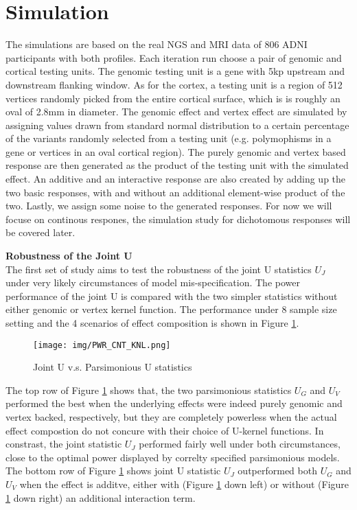\section{Simulation}
The simulations are based on the real NGS and MRI data of 806 ADNI participants with both profiles. Each iteration run choose a pair of genomic and cortical testing units. The genomic testing unit is a gene with 5kp upstream and downstream flanking window. As for the cortex, a testing unit is a region of 512 vertices randomly picked from the entire cortical surface, which is is roughly an oval of 2.8mm in diameter. The genomic effect and vertex effect are simulated by assigning values drawn from standard normal distribution to a certain percentage of the variants randomly selected from a testing unit (e.g. polymophisms in a gene or vertices in an oval cortical region). The purely genomic and vertex based response are then generated as the product of the testing unit with the simulated effect. An additive and an interactive response are also created by adding up the two basic responses, with and without an additional element-wise product of the two. Lastly, we assign some noise to the generated responses. For now we will focuse on continous respones, the simulation study for dichotomous responses will be covered later.

\noindent\textbf{Robustness of the Joint U} \\
The first set of study aims to test the robustness of the joint U statistics $U_J$ under very likely circumstances of model mis-specification. The power performance of the joint U is compared with the two simpler statistics without either genomic or vertex kernel function. The performance under 8 sample size setting and the 4 scenarios of effect composition is shown in Figure \ref{fig:PWR_CNT_KNL}.
\begin{figure}[!htbp]
\label{fig:PWR_CNT_KNL}
\centering
\texttt{[image: img/PWR\_CNT\_KNL.png]}
\caption{Joint U v.s. Parsimonious U statistics}
\end{figure}
The top row of Figure \ref{fig:PWR_CNT_KNL} shows that, the two parsimonious statistics $U_G$ and $U_V$ performed the best when the underlying effects were indeed purely genomic and vertex backed, respectively, but they are completely powerless when the actual effect compostion do not concure with their choice of U-kernel functions. In constrast, the joint statistic $U_J$ performed fairly well under both circumstances, close to the optimal power displayed by correlty specified parsimonious models. The bottom row of Figure \ref{fig:PWR_CNT_KNL} shows joint U statistic $U_J$ outperformed both $U_G$ and $U_V$ when the effect is additve, either with (Figure \ref{fig:PWR_CNT_KNL} down left) or without (Figure \ref{fig:PWR_CNT_KNL} down right) an additional interaction term.

